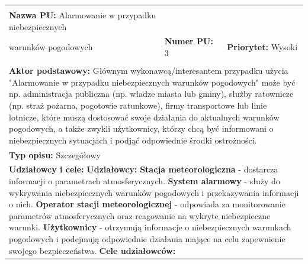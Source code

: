 \documentclass{article}
\begin{document}
\begin{center}
    \newpage

    \begin{center}
        \begin{tabular}{|l|l|l|}
        \hline
        & & \\[-2ex]
        \textbf{Nazwa PU:} Alarmowanie w przypadku niebezpiecznych \\ warunków pogodowych & \textbf{Numer PU:} 3 & \textbf{Priorytet:} Wysoki \\ & & \\
        \hline
        \hline
        \multicolumn{3}{|p{\dimexpr\linewidth-2\tabcolsep-2\arrayrulewidth}|}{\textbf{Aktor podstawowy:}
        \newline
        Głównym wykonawcą/interesantem przypadku użycia "Alarmowanie w przypadku niebezpiecznych warunków pogodowych"
        może być np. administracja publiczna (np. władze miasta lub gminy), służby ratownicze (np. straż pożarna, pogotowie ratunkowe),
        firmy transportowe lub linie lotnicze, które muszą dostosować swoje działania do aktualnych warunków pogodowych,
        a także zwykli użytkownicy, którzy chcą być informowani o niebezpiecznych sytuacjach i podjąć odpowiednie środki ostrożności.} \\
        \hline
        \hline
        \multicolumn{3}{|p{\dimexpr\linewidth-2\tabcolsep-2\arrayrulewidth}|}{\textbf{Typ opisu:} Szczegółowy} \\
        \hline
        \hline
        \multicolumn{3}{|p{\dimexpr\linewidth-2\tabcolsep-2\arrayrulewidth}|}{\textbf{Udziałowcy i cele:}
        \newline
        \textbf{Udziałowcy:}
        \newline
        \textbf{Stacja meteorologiczna} - dostarcza informacji o parametrach atmosferycznych.
        \newline
        \textbf{System alarmowy} - służy do wykrywania niebezpiecznych warunków pogodowych i przekazywania informacji o nich.
        \newline
        \textbf{Operator stacji meteorologicznej} - odpowiada za monitorowanie parametrów atmosferycznych oraz reagowanie na wykryte niebezpieczne warunki.
        \newline
        \textbf{Użytkownicy} - otrzymują informacje o niebezpiecznych warunkach pogodowych i podejmują odpowiednie działania mające na celu zapewnienie swojego bezpieczeństwa.
        \newline
        \textbf{Cele udziałowców:}
        \newline
}
\end{tabular}
\end{center}
\end{center}
\end{document}
